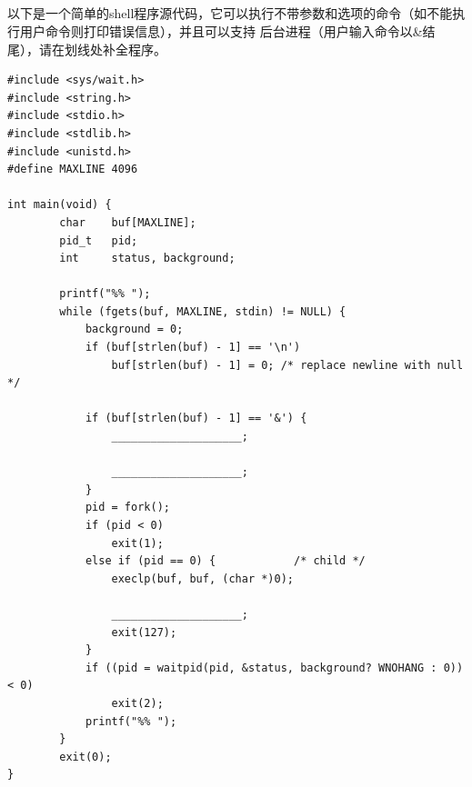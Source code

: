 \documentclass[a4paper,11pt]{article}
\begin{document}
\begin{CJK*}{UTF8}{gbsn}
\newpage
\subsection{}
以下是一个简单的shell程序源代码，它可以执行不带参数和选项的命令（如不能执行用户命令则打印错误信息），并且可以支持
后台进程（用户输入命令以\&结尾），请在划线处补全程序。
\begin{verbatim}
#include <sys/wait.h>
#include <string.h>
#include <stdio.h>
#include <stdlib.h>
#include <unistd.h>
#define MAXLINE 4096

int main(void) {
        char    buf[MAXLINE];   
        pid_t   pid;
        int     status, background;

        printf("%% ");  
        while (fgets(buf, MAXLINE, stdin) != NULL) {
            background = 0;
            if (buf[strlen(buf) - 1] == '\n')
                buf[strlen(buf) - 1] = 0; /* replace newline with null */

            if (buf[strlen(buf) - 1] == '&') {
                ____________________;

                ____________________;
            }
            pid = fork();
            if (pid < 0) 
                exit(1);
            else if (pid == 0) {            /* child */
                execlp(buf, buf, (char *)0);

                ____________________;
                exit(127);
            }
            if ((pid = waitpid(pid, &status, background? WNOHANG : 0)) < 0)
                exit(2);
            printf("%% ");
        }
        exit(0);
}
\end{verbatim}


\end{CJK*}
\end{document}
